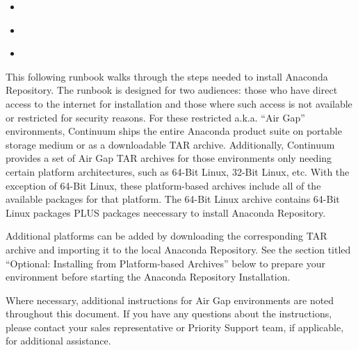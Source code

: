 \documentclass[letterpaper,10pt,openany,oneside]{sphinxmanual}
\begin{document}
{\begin{minipage}{0.95\linewidth}
\begin{itemize}
\item {} 
\label{AnacondaRepository:id12}{\hyperref[AnacondaRepository:set\string-up\string-automatic\string-restart\string-on\string-reboot\string-fail\string-or\string-error]{}}

\item {} 
\label{AnacondaRepository:id13}{\hyperref[AnacondaRepository:server\string-configuration\string-requires\string-mongo]{}}

\item {} 
\label{AnacondaRepository:id14}{\hyperref[AnacondaRepository:setup\string-mirrors]{}}

\end{itemize}
\end{minipage}}
\begin{center}\setlength{\fboxsep}{5pt}\end{center}

This following runbook walks through the steps needed to install
Anaconda Repository. The runbook is designed for two audiences: those who have
direct access to the internet for installation and those where such
access is not available or restricted for security reasons. For these
restricted a.k.a. ``Air Gap'' environments, Continuum ships the entire
Anaconda product suite on portable storage medium or as a downloadable
TAR archive. Additionally, Continuum provides a set of Air Gap TAR archives for
those environments only needing certain platform architectures,
such as 64-Bit Linux, 32-Bit Linux, etc.
With the exception of 64-Bit Linux, these platform-based archives include
all of the available packages for that platform.
The 64-Bit Linux archive contains 64-Bit Linux packages PLUS packages
neecessary to install Anaconda Repository.

Additional platforms can be added by downloading the corresponding TAR archive
and importing it to the local Anaconda Repository. See the section titled ``Optional:
Installing from Platform-based Archives'' below to prepare your environment
before starting the Anaconda Repository Installation.

Where necessary, additional instructions for Air Gap
environments are noted throughout this document. If you have any questions about the
instructions, please contact your sales representative or Priority
Support team, if applicable, for additional assistance.
\end{document}
